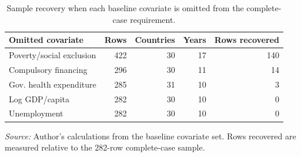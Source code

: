\begin{table}[H]
\centering
\small
\caption{Sample recovery when each baseline covariate is omitted from the complete-case requirement.}
\label{tab:leave_one_variable_out_sample_recovery}
\begin{tabular}{@{}lrrrr@{}}
\toprule
Omitted covariate & Rows & Countries & Years & Rows recovered \\
\midrule
Poverty/social exclusion & 422 & 30 & 17 & 140 \\
Compulsory financing & 296 & 30 & 11 & 14 \\
Gov. health expenditure & 285 & 31 & 10 & 3 \\
Log GDP/capita & 282 & 30 & 10 & 0 \\
Unemployment & 282 & 30 & 10 & 0 \\
\bottomrule
\end{tabular}

\vspace{0.2em}
\begin{minipage}{0.92\textwidth}\scriptsize \textit{Source:} Author's calculations from the baseline covariate set. Rows recovered are measured relative to the 282-row complete-case sample.\end{minipage}
\end{table}

